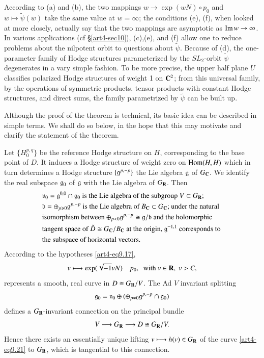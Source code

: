 According to (a) and (b), the two mappings $w \to \exp (w N) \circ p_0$ and $w \longmapsto \tilde{\psi} (w)$ take the same value at $w =\infty$; the conditions (e), (f), when looked at more closely, actually say that the two mappings are asymptotic as $\operatorname{Im}  w \to \infty$. In various applications (cf \S \ref{art4-sec10}), (c),\pageoriginale (e), and (f) allow one to reduce problems about the nilpotent orbit to questions about $\tilde{\psi}$. Because of (d), the one-parameter family of Hodge structures parameterized by the $SL_2$-orbit $\tilde{\psi}$ degenerates in a vary simple fashion. To be more precise, the upper half plane $U$ classifies polarized Hodge structures of weight 1 on $\mathbf{C}^2$; from this universal family, by the operations of symmetric products, tensor products with constant Hodge structures, and direct sums, the family parametrized by $\tilde{\psi}$ can be built up.

Although the proof of the theorem is technical, its basic idea can be described in simple terms. We shall do so below, in the hope that this may motivate and clarify the statement of the theorem.

Let $\{H^{p,q}_0\}$ be the reference Hodge structure on $H$, corresponding to the base point of $D$. It induces a Hodge structure of weight zero on $\operatorname{Hom} (H,H)$ which in turn determines a Hodge structure $\{\mathfrak{g}^{p,-p}\}$ the Lie algebra $\mathfrak{g}$ of $G_{\mathbf{C}}$. We identify the real subspace $\mathfrak{g}_0$ of $\mathfrak{g}$ with the Lie algebra of $G_{\mathbf{R}}$. Then
\begin{align}
& \text{$\mathfrak{v}_0 = \mathfrak{g}^{0,0} \cap \mathfrak{g}_0$ is the Lie algebra of the subgroup $V \subset G_{\mathbf{R}}$;} \notag\\
& \text{$\mathfrak{b} = \oplus_{p \geqslant 0} \mathfrak{g}^{p,-p}$ is the Lie algebra of $B_{\mathbf{C}} \subset G_{\mathbf{C}}$; under the natural} \notag\\
& \text{isomorphism between $\oplus_{p<0} \mathfrak{g}^{p,-p} \cong \mathfrak{g}  / \mathfrak{b}$ and the holomorphic}\notag\\
& \text{tangent space of $\check{D} \cong G_{\mathbf{C}} / B_{\mathbf{C}}$ at the origin, $\mathfrak{g}^{-1,1}$ corresponds to } \notag\\
& \text{the subspace of horizontal vectors.} \label{art4-eq9.20}
\end{align}
According to the hypotheses \eqref{art4-eq9.17},
\begin{equation}
v \longmapsto  \exp (\sqrt{-1} v N)  \quad p_0, \;  \text{ with } v \in \mathbf{R}, \; v > C,  
\label{art4-eq9.21}
\end{equation}
represents a smooth, real curve in $D \cong G_{\mathbf{R}}/V$. The Ad $V$ invariant splitting
$$
\mathfrak{g}_0 = \mathfrak{v}_0 \oplus (\oplus_{p \neq 0} \mathfrak{g}^{p,-p} \cap \mathfrak{g}_0)
$$
defines a $G_{\mathbf{R}}$-invariant connection on the principal bundle
$$
V \longrightarrow G_{\mathbf{R}} \longrightarrow D \cong G_{\mathbf{R}} / V.
$$
Hence there exists an essentially unique lifting $v \longmapsto h (v) \in G_{\mathbf{R}}$ of the curve \eqref{art4-eq9.21} to $G_{\mathbf{R}}$, which is tangential to this connection.

